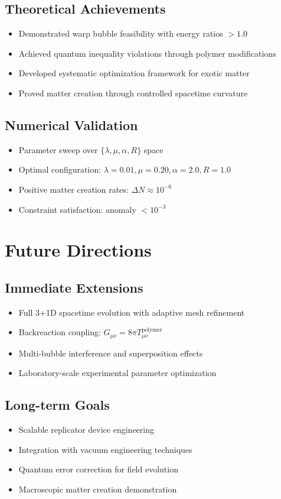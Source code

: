 \documentclass[11pt]{article}
\begin{document}
\subsection{Theoretical Achievements}
\begin{itemize}
\item Demonstrated warp bubble feasibility with energy ratios $> 1.0$
\item Achieved quantum inequality violations through polymer modifications
\item Developed systematic optimization framework for exotic matter
\item Proved matter creation through controlled spacetime curvature
\end{itemize}

\subsection{Numerical Validation}
\begin{itemize}
\item Parameter sweep over $\{\lambda, \mu, \alpha, R\}$ space
\item Optimal configuration: $\lambda=0.01, \mu=0.20, \alpha=2.0, R=1.0$
\item Positive matter creation rates: $\Delta N \approx 10^{-6}$
\item Constraint satisfaction: anomaly $< 10^{-3}$
\end{itemize}

\section{Future Directions}

\subsection{Immediate Extensions}
\begin{itemize}
\item Full 3+1D spacetime evolution with adaptive mesh refinement
\item Backreaction coupling: $G_{\mu\nu} = 8\pi T_{\mu\nu}^{\text{polymer}}$
\item Multi-bubble interference and superposition effects
\item Laboratory-scale experimental parameter optimization
\end{itemize}

\subsection{Long-term Goals}
\begin{itemize}
\item Scalable replicator device engineering
\item Integration with vacuum engineering techniques
\item Quantum error correction for field evolution
\item Macroscopic matter creation demonstration
\end{itemize}
\end{document}
